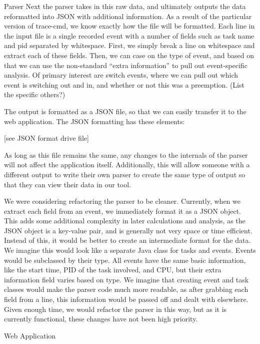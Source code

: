 \documentclass[midyear]{hmcclinic}
\begin{document}
  Parser
  Next the parser takes in this raw data, and ultimately outputs the data reformatted into JSON with additional information. As a result of the particular version of trace-cmd, we know exactly how the file will be formatted. Each line in the input file is a single recorded event with a number of fields such as task name and pid separated by whitespace. First, we simply break a line on whitespace and extract each of these fields. Then, we can case on the type of event, and based on that we can use the non-standard “extra information” to pull out event-specific analysis. Of primary interest are switch events, where we can pull out which event is switching out and in, and whether or not this was a preemption. (List the specific others?)

  The output is formatted as a JSON file, so that we can easily transfer it to the web application. The JSON formatting has these elements:

  [see JSON format drive file]

  As long as this file remains the same, any changes to the internals of the parser will not affect the application itself. Additionally, this will allow someone with a different output to write their own parser to create the same type of output so that they can view their data in our tool.

  We were considering refactoring the parser to be cleaner. Currently, when we extract each field from an event, we immediately format it as a JSON object. This adds some additional complexity in later calculations and analysis, as the JSON object is a key-value pair, and is generally not very space or time efficient. Instead of this, it would be better to create an intermediate format for the data. We imagine this would look like a separate Java class for tasks and events. Events would be subclassed by their type. All events have the same basic information, like the start time, PID of the task involved, and CPU, but their extra information field varies based on type. We imagine that creating event and task classes would make the parser code much more readable, as after grabbing each field from a line, this information would be passed off and dealt with elsewhere. Given enough time, we would refactor the parser in this way, but as it is currently functional, these changes have not been high priority.

  Web Application
\end{document}
